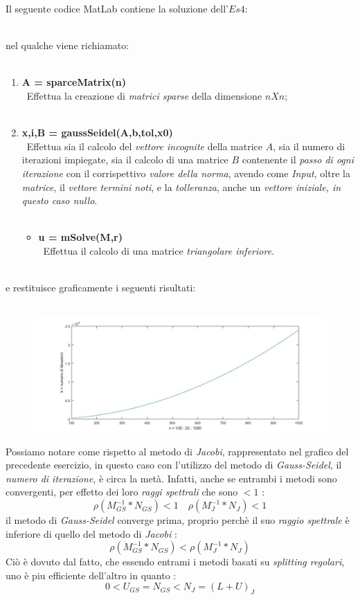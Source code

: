Il seguente codice MatLab contiene la soluzione dell'$Es 4$:\\\
	
nel qualche viene richiamato:\\\
	\begin{enumerate}
		\item \textbf{A = sparceMatrix(n)}\\\
			Effettua la creazione di \textit{matrici sparse} della dimensione $nXn$;\\\
		\item \textbf{x,i,B = gaussSeidel(A,b,tol,x0)}\\\
			Effettua sia il calcolo del \textit{vettore incognite} della matrice $A$, sia il numero di iterazioni impiegate, sia il calcolo di una matrice $B$ contenente il \textit{passo di ogni iterazione} con il corrispettivo \textit{valore della norma}, avendo come \textit{Input}, oltre la 	\textit{matrice}, il \textit{vettore termini noti}, e la \textit{tolleranza}, anche un \textit{vettore iniziale, in questo caso nullo}.\\\
			
			\begin{itemize}
				\item \textbf{u = mSolve(M,r)}\\\
					Effettua il calcolo di una matrice \textit{triangolare inferiore}.\\\
					
			\end{itemize}
	\end{enumerate}
e restituisce graficamente i seguenti risultati:\\\
	\begin{figure}[H]
		\includegraphics[width=\textwidth]{Plot/Cap_6_Es_4}
	\end{figure}
Possiamo notare come rispetto al metodo di \textit{Jacobi}, rappresentato nel grafico del precedente esercizio, in questo caso con l'utilizzo del metodo di \textit{Gauss-Seidel}, il \textit{numero di iterazione}, è circa la metà. Infatti, anche se entrambi i metodi sono convergenti, per effetto dei loro \textit{raggi spettrali} che sono $<1$ :
	\[
		\rho(M^{-1}_{GS}*N_{GS})<1 \quad \rho(M^{-1}_{J}*N_{J})<1
	\]
il metodo di \textit{Gauss-Seidel} converge prima, proprio perchè il suo \textit{raggio spettrale} è inferiore di quello del metodo di \textit{Jacobi} :
	\[
		\rho(M^{-1}_{GS}*N_{GS})<\rho(M^{-1}_{J}*N_{J})
	\]
Ciò è dovuto dal fatto, che essendo entrami i metodi basati su \textit{splitting regolari}, uno è piu efficiente dell'altro in quanto :
	\[
		0<U_{GS}=N_{GS}<N_{J}=(L+U)_{J}
	\]
